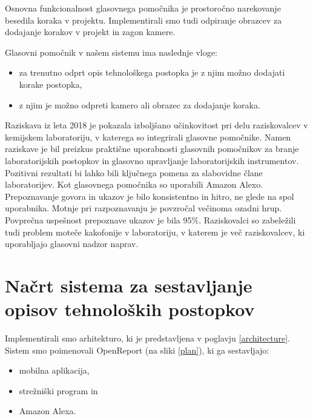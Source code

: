 \documentclass[a4paper, 12pt]{book}
\begin{document}

Osnovna funkcionalnost glasovnega pomočnika je prostoročno narekovanje besedila koraka v projektu.
Implementirali smo tudi odpiranje obrazcev za dodajanje korakov v projekt in zagon kamere.

\bigbreak 
Glasovni pomočnik v našem sistemu ima naslednje vloge:
\begin{itemize}
	\item za trenutno odprt opis tehnološkega postopka je z njim možno dodajati korake postopka,
	\item z njim je možno odpreti kamero ali obrazec za dodajanje koraka.
\end{itemize}

Raziskava iz leta 2018 \cite{austerjost2018introducing} je pokazala izboljšano učinkovitost pri delu raziskovalcev v kemijskem laboratoriju, v katerega so integrirali glasovne pomočnike.
Namen raziskave je bil preizkus praktične uporabnosti glasovnih pomočnikov za branje laboratorijskih postopkov in glasovno upravljanje laboratorijskih instrumentov.
Pozitivni rezultati bi lahko bili ključnega pomena za slabovidne člane laboratorijev.
Kot glasovnega pomočnika so uporabili Amazon Alexo.
Prepoznavanje govora in ukazov je bilo konsistentno in hitro, ne glede na spol uporabnika.
Motnje pri razpoznavanju je povzročal večinoma ozadni hrup.
Povprečna uspešnost prepoznave ukazov je bila 95\%.
Raziskovalci so zabeležili tudi problem moteče kakofonije v laboratoriju, v katerem je več raziskovalcev, ki uporabljajo glasovni nadzor naprav.

\clearpage

\section{Načrt sistema za sestavljanje opisov tehnoloških postopkov}


Implementirali smo arhitekturo, ki je predstavljena v poglavju \ref{architecture}.
Sistem smo poimenovali OpenReport (na sliki \ref{plan}), ki ga sestavljajo:

\begin{itemize}
	\item mobilna aplikacija,
	\item strežniški program in 
	\item Amazon Alexa.
\end{itemize}
\end{document}
